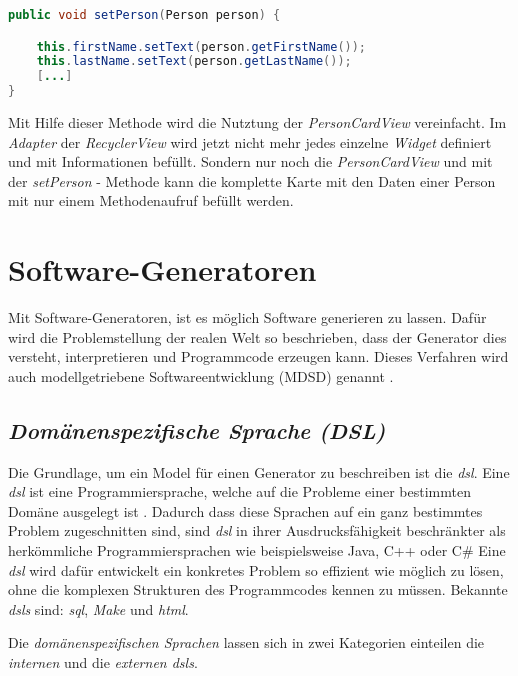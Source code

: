 \begin{lstlisting}[label=lst:setPerson,
language=java,
firstnumber=1,
caption=\textit{setPerson} - Methode aus der \textit{PersonCardView}.]				  
public void setPerson(Person person) {

	this.firstName.setText(person.getFirstName());
	this.lastName.setText(person.getLastName());	
	[...]
}
\end{lstlisting}

\newpage

Mit Hilfe dieser Methode wird die Nutztung der \textit{PersonCardView} vereinfacht. Im \textit{Adapter} der \textit{RecyclerView} wird jetzt nicht mehr jedes einzelne \textit{Widget} definiert und mit Informationen befüllt. Sondern nur noch die \textit{PersonCardView} und mit der \textit{setPerson} - Methode kann die komplette Karte mit den Daten einer Person mit nur einem Methodenaufruf befüllt werden.

\section{Software-Generatoren}\label{sec:generators}

Mit Software-Generatoren, ist es möglich Software generieren zu lassen. Dafür wird die Problemstellung der realen Welt so beschrieben, dass der Generator dies versteht, interpretieren und Programmcode erzeugen kann.
Dieses Verfahren wird auch modellgetriebene Softwareentwicklung (MDSD) genannt \cite{mdsd}.

\subsection{\textit{Domänenspezifische Sprache (DSL)}}\label{sec:dsl}
Die Grundlage, um ein Model für einen Generator zu beschreiben ist die \textit{\acl{dsl}}.
Eine \textit{\acs{dsl}} ist eine Programmiersprache, welche auf die Probleme einer bestimmten Domäne ausgelegt ist \cite{dslHudak}. Dadurch dass diese Sprachen auf ein ganz bestimmtes Problem zugeschnitten sind, sind \textit{\acl{dsl}} in ihrer Ausdrucksfähigkeit beschränkter als herkömmliche Programmiersprachen wie beispielsweise Java, C++ oder C\# Eine \textit{\acl{dsl}} wird dafür entwickelt ein konkretes Problem so effizient wie möglich zu lösen, ohne die komplexen Strukturen des Programmcodes kennen zu müssen.
Bekannte \textit{\aclp{dsl}} sind: \textit{\ac{sql}}, \textit{Make} und \textit{\acf{html}}.

Die \textit{domänenspezifischen Sprachen} lassen sich in zwei Kategorien einteilen die \textit{internen} und die \textit{externen \acsp{dsl}}.

